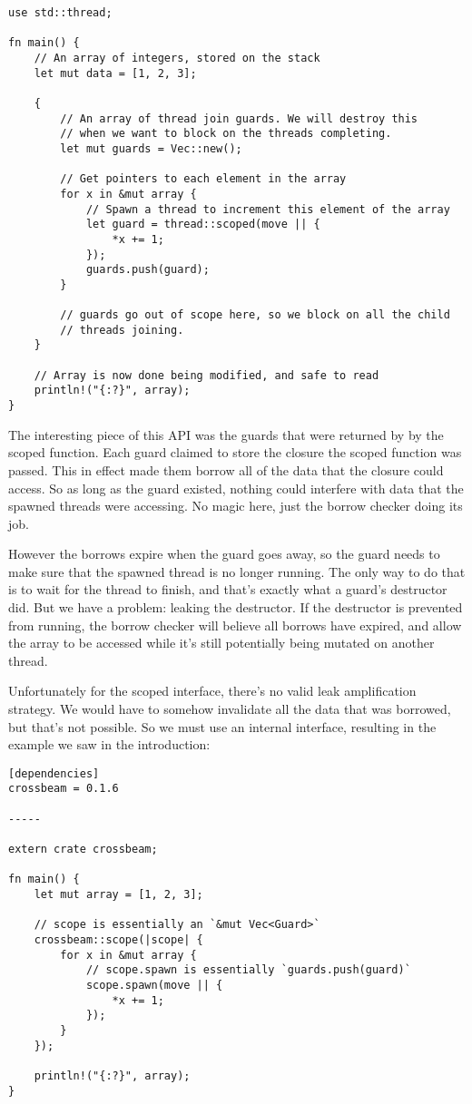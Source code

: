 \begin{verbatim}
use std::thread;

fn main() {
    // An array of integers, stored on the stack
    let mut data = [1, 2, 3];

    {
        // An array of thread join guards. We will destroy this
        // when we want to block on the threads completing.
        let mut guards = Vec::new();

        // Get pointers to each element in the array
        for x in &mut array {
            // Spawn a thread to increment this element of the array
            let guard = thread::scoped(move || {
                *x += 1;
            });
            guards.push(guard);
        }

        // guards go out of scope here, so we block on all the child
        // threads joining.
    }

    // Array is now done being modified, and safe to read
    println!("{:?}", array);
}
\end{verbatim}

The interesting piece of this API was the guards that were returned by
by the scoped function. Each guard claimed to store the closure the
scoped function was passed. This in effect made them borrow all of the
data that the closure could access. So as long as the guard existed, nothing
could interfere with data that the spawned threads were accessing. No magic
here, just the borrow checker doing its job.

However the borrows expire when the guard goes away, so the guard needs to
make sure that the spawned thread is no longer running. The only way to do
that is to wait for the thread to finish, and that's exactly what a guard's
destructor did. But we have a problem: leaking the destructor. If the destructor
is prevented from running, the borrow checker will believe all borrows have
expired, and allow the array to be accessed while it's still potentially
being mutated on another thread.

Unfortunately for the scoped interface, there's no valid leak amplification strategy.
We would have to somehow invalidate all the data that was borrowed, but that's
not possible. So we must use an internal interface, resulting in the example
we saw in the introduction:

\begin{verbatim}
[dependencies]
crossbeam = 0.1.6

-----

extern crate crossbeam;

fn main() {
    let mut array = [1, 2, 3];

    // scope is essentially an `&mut Vec<Guard>`
    crossbeam::scope(|scope| {
        for x in &mut array {
            // scope.spawn is essentially `guards.push(guard)`
            scope.spawn(move || {
                *x += 1;
            });
        }
    });

    println!("{:?}", array);
}
\end{verbatim}

